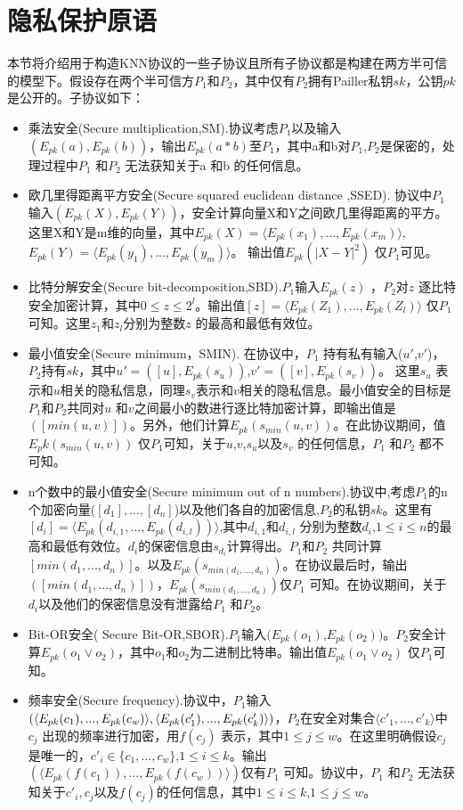 \section{隐私保护原语}
本节将介绍用于构造KNN协议的一些子协议且所有子协议都是构建在两方半可信的模型下。假设存在两个半可信方$P_1$和$P_2$，其中仅有$P_2$拥有Pailler私钥$sk$，公钥$pk$ 是公开的。子协议如下：
\begin{itemize}
\item 乘法安全(Secure multiplication,SM).协议考虑$P_1$以及输入$(E_{pk}(a),E_{pk}(b))$，输出$E_{pk}(a*b)$至$P_1$，其中a和b对$P_1$,$P_2$是保密的，处理过程中$P_1$ 和$P_2$ 无法获知关于a 和b 的任何信息。
\item 欧几里得距离平方安全(Secure squared euclidean distance ,SSED). 协议中$P_1$输入$(E_{pk}(X),E_{pk}(Y))$，安全计算向量X和Y之间欧几里得距离的平方。这里X和Y是m维的向量，其中$E_{pk}(X)=\langle E_{pk}(x_1),...,E_{pk}(x_m)\rangle$, $E_{pk}(Y)=\langle E_{pk}(y_1),...,E_{pk}(y_m)\rangle$。 输出值$E_{pk}({|X-Y|}^2)$ 仅$P_1$可见。
\item 比特分解安全(Secure bit-decomposition,SBD).$P_1$输入$E_{pk}(z)$ ，$P_2$对$z$ 逐比特安全加密计算，其中$0\leq z \leq 2^l$。输出值$[z] = \langle E_{pk}(Z_1),...,E_{pk}(Z_l)\rangle$ 仅$P_1$可知。这里$z_1$和$z_l$分别为整数$z$ 的最高和最低有效位。
\item 最小值安全(Secure minimum，SMIN). 在协议中，$P_1$ 持有私有输入($u'$,$v'$)，$P_2$持有$sk$，其中$u'=([u],E_{pk}(s_u))$,$v'=([v],E_{pk}(s_v))$。 这里$s_u$ 表示和$u$相关的隐私信息，同理$s_v$表示和$v$相关的隐私信息。最小值安全的目标是$P_1$和$P_2$共同对$u$ 和$v$之间最小的数进行逐比特加密计算，即输出值是$([min(u,v)])$。另外，他们计算$E_{pk}(s_{min}(u,v))$。在此协议期间，值$E_pk(s_{min}(u,v))$ 仅$P_1$可知，关于$u$,$v$,$s_u$以及$s_v$ 的任何信息，$P_1$ 和$P_2$ 都不可知。
\item n个数中的最小值安全(Secure minimum out of n numbers).协议中,考虑$P_1$的n个加密向量($[d_1],...,[d_n]$)以及他们各自的加密信息,$P_2$的私钥$sk$。这里有$[d_i]=\langle E_{pk}(d_{i,1},...,E_{pk}(d_{i,l}))\rangle$,其中$d_{i,1}$和$d_{i,l}$ 分别为整数$d_i$,$1\leq i \leq n$的最高和最低有效位。$d_i$的保密信息由$s_{d_i}$计算得出。$P_1$和$P_2$ 共同计算$[min(d_1,...,d_n)]$。以及$E_{pk}(s_{min(d_1,...,d_n)})$。在协议最后时，输出$([min(d_1,...,d_n)])$，$E_{pk}(s_{min(d_1,...,d_n)})$仅$P_1$ 可知。在协议期间，关于$d_i$以及他们的保密信息没有泄露给$P_1$ 和$P_2$。
\item Bit-OR安全( Secure Bit-OR,SBOR).$P_1$输入$(E_{pk}(o_1)$,$E_{pk}(o_2))$。$P_2$安全计算$E_{pk}(o_1 \vee o_2)$，其中$o_1$和$o_2$为二进制比特串。输出值$E_{pk}(o_1 \vee o_2)$ 仅$P_1$可知。
\item 频率安全(Secure frequency).协议中，$P_1$输入$(\langle E_{pk}(c_1),...,E_{pk}(c_w)\rangle,\langle E_{pk}(c'_1)\\,...,E_{pk}(c'_k)\rangle)$，$P_2$在安全对集合$\langle c'_1,...,c'_k\rangle$中$c_j$ 出现的频率进行加密，用$f(c_j)$ 表示，其中$1\leq j\leq w$。在这里明确假设$c_j$是唯一的，$c'_i \in \{c_1,...,c_w\}$,$1 \leq i\leq k$。输出$(\langle E_{pk}(f(c_1)),...,E_{pk}(f(c_w))\rangle)$仅有$P_1$ 可知。协议中，$P_1$ 和$P_2$ 无法获知关于$c'_i,c_j$以及$f(c_j)$的任何信息，其中$1 \leq i\leq k$,$1\leq j \leq w$。
\end{itemize}
